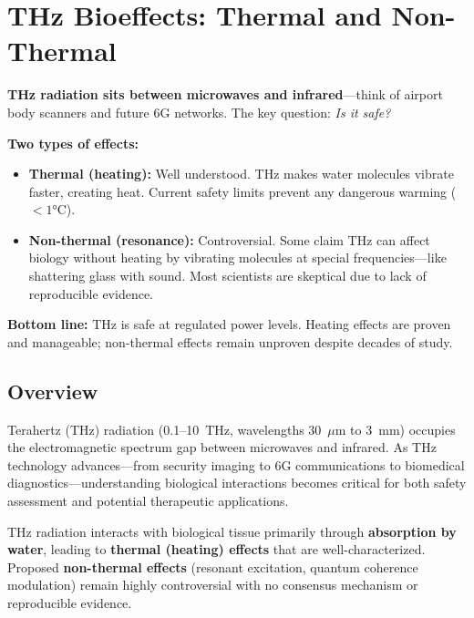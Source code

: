 \chapter{THz Bioeffects: Thermal and Non-Thermal}
\label{ch:thz-bioeffects}

\begin{nontechnical}
\textbf{THz radiation sits between microwaves and infrared}---think of airport body scanners and future 6G networks. The key question: \textit{Is it safe?}

\textbf{Two types of effects:}
\begin{itemize}
\item \textbf{Thermal (heating):} Well understood. THz makes water molecules vibrate faster, creating heat. Current safety limits prevent any dangerous warming ($<1°$C).
\item \textbf{Non-thermal (resonance):} Controversial. Some claim THz can affect biology without heating by vibrating molecules at special frequencies---like shattering glass with sound. Most scientists are skeptical due to lack of reproducible evidence.
\end{itemize}

\textbf{Bottom line:} THz is safe at regulated power levels. Heating effects are proven and manageable; non-thermal effects remain unproven despite decades of study.
\end{nontechnical}

\section{Overview}

Terahertz (THz) radiation (0.1--10~THz, wavelengths 30~$\mu$m to 3~mm) occupies the electromagnetic spectrum gap between microwaves and infrared. As THz technology advances---from security imaging to 6G communications to biomedical diagnostics---understanding biological interactions becomes critical for both safety assessment and potential therapeutic applications.

\begin{keyconcept}
THz radiation interacts with biological tissue primarily through \textbf{absorption by water}, leading to \textbf{thermal (heating) effects} that are well-characterized. Proposed \textbf{non-thermal effects} (resonant excitation, quantum coherence modulation) remain highly controversial with no consensus mechanism or reproducible evidence.
\end{keyconcept}

